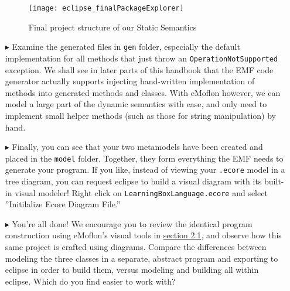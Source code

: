 \begin{itemize}
\begin{figure}[htbp]
	\centering
  \texttt{[image: eclipse\_finalPackageExplorer]}
	\caption{Final project structure of our Static Semantics}
	\label{fig:builtModel}
\end{figure}

\item[$\blacktriangleright$] Examine the generated files in \texttt{gen} folder, especially the default implementation for all methods that just throw an
\texttt{OperationNotSupported} exception. We shall see in later parts of this handbook that the EMF code generator actually supports injecting hand-written
implementation of methods into generated methods and classes. With eMoflon however, we can model a large part of the dynamic semantics with ease, and only need
to implement small helper methods (such as those for string manipulation) by hand.

\item[$\blacktriangleright$] Finally, you can see that your two metamodels have been created and placed in the \texttt{model} folder. Together, they form
everything the EMF needs to generate your program. If you like, instead of viewing your \texttt{.ecore} model in a tree diagram, you can request eclipse to
build a visual diagram with its built-in visual modeler! Right click on \texttt{LearningBoxLanguage.ecore} and select ''Initilalize Ecore Diagram File.''


\item[$\blacktriangleright$] You're all done! We encourage you to review the identical program construction using eMoflon's visual tools in
\hyperlink{sec:static vis}{section 2.1}, and observe how this same project is crafted using diagrams. Compare the differences between modeling the three classes in a
separate, abstract program and exporting to eclipse in order to build them, versus modeling and building all within eclipse. Which do you find easier to work
with?

\end{itemize}